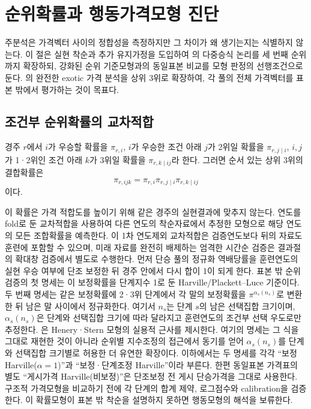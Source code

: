 \section{순위확률과 행동가격모형 진단}

주분석은 가격벡터 사이의 정합성을 측정하지만 그 차이가 왜 생기는지는 식별하지
않는다. 이 절은 실현 착순과 추가 유지가정을 도입하여
\citet{snowbergwolfers2010}의 다중승식 논리를 세 번째 순위까지 확장하되,
강화된 순위 기준모형과의 동일표본 비교를 모형 판정의 선행조건으로 둔다.
\citet{koivurantakorhonen2019}의 완전한 exotic 가격 분석을 상위 3위로
확장하여, 각 풀의 전체 가격벡터를 표본 밖에서 평가하는 것이 목표다.

\subsection{조건부 순위확률의 교차적합}

경주 $r$에서 $i$가 우승할 확률을 $\pi_{r,i}$, $i$가 우승한 조건 아래 $j$가
2위일 확률을 $\pi_{r,j\mid i}$, $i,j$가 1·2위인 조건 아래 $k$가 3위일 확률을
$\pi_{r,k\mid ij}$라 한다. 그러면 순서 있는 상위 3위의 결합확률은
\begin{equation}
  \pi_{r,ijk}
  =\pi_{r,i}\pi_{r,j\mid i}\pi_{r,k\mid ij}
  \label{eq:rank-probability-factorization}
\end{equation}
이다.

이 확률은 가격 적합도를 높이기 위해 같은 경주의 실현결과에 맞추지 않는다.
연도를 fold로 둔 교차적합을 사용하여 다른 연도의 착순자료에서 추정한 모형으로
해당 연도의 모든 조합확률을 예측한다. 이 1차 연도제외 교차적합은 검증연도보다
뒤의 자료도 훈련에 포함할 수 있으며, 미래 자료를 완전히 배제하는 엄격한
시간순 검증은 결과절의 확대창 검증에서 별도로 수행한다. 먼저 단승 풀의 정규화
역배당률을 훈련연도의 실현 우승 여부에 단조 보정한 뒤 경주 안에서 다시 합이
1이 되게 한다. 표본 밖 순위검증의 첫 명세는 이 보정확률을 단계지수 1로 둔
Harville/Plackett--Luce 기준이다. 두 번째 명세는 같은 보정확률에 2·3위 단계에서 각 말의
보정확률을 $\pi^{\alpha_s(n_s)}$로 변환한 뒤 남은 말 사이에서 정규화한다.
여기서 $n_s$는 단계 $s$의 남은 선택집합 크기이며, $\alpha_s(n_s)$은 단계와
선택집합 크기에 따라 달라지고 훈련연도의 조건부 선택
우도로만 추정한다. \citet[제3.1절, 식 (7)]{lobaconshone2008}은
Henery·Stern 모형의 실용적 근사를 제시한다. 여기의 명세는 그 식을 그대로
재현한 것이 아니라 순위별 지수조정의 접근에서 동기를 얻어
$\alpha_s(n_s)$를 단계와 선택집합 크기별로 허용한 더 유연한 확장이다.
이하에서는 두 명세를 각각 ``보정 Harville($\alpha=1$)''과
``보정·단계조정 Harville''이라 부른다. 한편 동일표본 가격표의 별도
``게시가격 Harville(비보정)''은 단조보정 전 게시 단승가격을 그대로 사용한다.
구조적 가격모형을 비교하기 전에 각 단계의 합계 제약,
로그점수와 calibration을 검증한다. 이 확률모형이 표본 밖 착순을 설명하지
못하면 행동모형의 해석을 보류한다.

